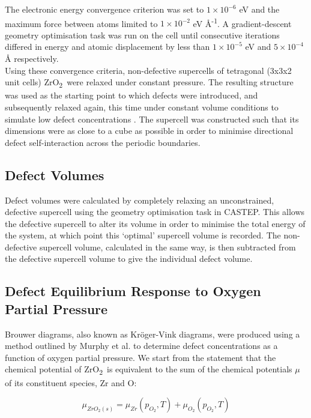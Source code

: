 \documentclass[11pt,a4paper]{article}
\newcommand{\zirconia}{ZrO\textsubscript{2}}
\begin{document}
The electronic energy convergence criterion was set to $1\times10^{-6}$ eV and the maximum force between atoms limited to $1\times10^{-2}$ eV \r{A}\textsuperscript{-1}. A gradient-descent geometry optimisation task was run on the cell until consecutive iterations differed in energy and atomic displacement by less than $1\times10^{-5}$ eV and $5\times10^{-4}$ \r{A} respectively.  \\

Using these convergence criteria, non-defective supercells of tetragonal (3x3x2 unit cells) \zirconia\ were relaxed under constant pressure. The resulting structure was used as the starting point to which defects were introduced, and subsequently relaxed again, this time under constant volume conditions to simulate low defect concentrations \cite{Murphy2014, Bell2015}. The supercell was constructed such that its dimensions were as close to a cube as possible in order to minimise directional defect self-interaction across the periodic boundaries. 


\subsection{Defect Volumes}

Defect volumes were calculated by completely relaxing an unconstrained, defective supercell using the geometry optimisation task in CASTEP. This allows the defective supercell to alter its volume in order to minimise the total energy of the system, at which point this `optimal' supercell volume is recorded. The non-defective supercell volume, calculated in the same way, is then subtracted from the defective supercell volume to give the individual defect volume.

\subsection{Defect Equilibrium Response to Oxygen Partial Pressure}

Brouwer diagrams, also known as Kr{\"o}ger-Vink diagrams, were produced using a method outlined by Murphy et al. \cite{Murphy2014a} to determine defect concentrations as a function of oxygen partial pressure. We start from the statement that the chemical potential of \zirconia\ is equivalent to the sum of the chemical potentials $\mu$ of its constituent species, Zr and O:

\begin{equation}
{\mu}_{ZrO_2(s)} = {\mu}_{Zr}(p_{O_2}, T) + {\mu}_{O_2}(p_{O_2}, T)
\label{mewZrO2}
\end{equation}
\end{document}
